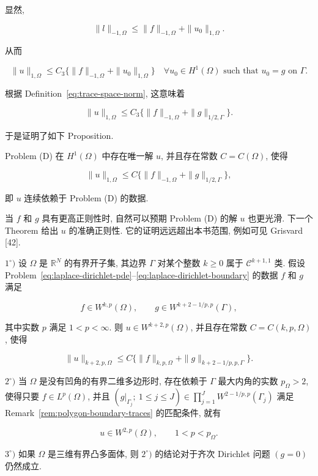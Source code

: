 显然,

\[
\|l\|_{-1,\Omega}\leq\|f\|_{-1,\Omega}+\|u_0\|_{1,\Omega}.
\]

从而

\[
\|u\|_{1,\Omega}\leq C_3\{\|f\|_{-1,\Omega}+\|u_0\|_{1,\Omega}\}\quad\forall u_0\in H^1(\Omega)\text{ such that }u_0=g\text{ on }\Gamma.
\]

根据 Definition~\eqref{eq:trace-space-norm}, 这意味着

\[
\|u\|_{1,\Omega}\leq C_3\{\|f\|_{-1,\Omega}+\|g\|_{1/2,\Gamma}\}.
\]

于是证明了如下 Proposition.

\setcounter{statement}{0}
\renewcommand{\theHstatement}{proposition.\thesection.\arabic{statement}}
\begin{Proposition}\label{prop:laplace-dirichlet-wellposedness}
Problem (D) 在 $H^1(\Omega)$ 中存在唯一解 $u$, 并且存在常数 $C=C(\Omega)$, 使得

\begin{equation}\label{eq:dirichlet-stability-h1}
\|u\|_{1,\Omega}\leq C\{\|f\|_{-1,\Omega}+\|g\|_{1/2,\Gamma}\},
\end{equation}

即 $u$ 连续依赖于 Problem (D) 的数据.
\end{Proposition}

当 $f$ 和 $g$ 具有更高正则性时, 自然可以预期 Problem (D) 的解 $u$ 也更光滑. 下一个 Theorem 给出 $u$ 的准确正则性. 它的证明远远超出本书范围, 例如可见 Grisvard [42].

\setcounter{statement}{7}
\renewcommand{\theHstatement}{theorem.\thesection.\arabic{statement}}
\begin{Theorem}\label{thm:laplace-dirichlet-regularity}
$1^\circ)$ 设 $\Omega$ 是 $\mathbb R^N$ 的有界开子集, 其边界 $\Gamma$ 对某个整数 $k\geq0$ 属于 $\mathcal C^{k+1,1}$ 类. 假设 Problem~\eqref{eq:laplace-dirichlet-pde}--\eqref{eq:laplace-dirichlet-boundary} 的数据 $f$ 和 $g$ 满足

\[
f\in W^{k,p}(\Omega),\qquad g\in W^{k+2-1/p,p}(\Gamma),
\]

其中实数 $p$ 满足 $1<p<\infty$. 则 $u\in W^{k+2,p}(\Omega)$, 并且存在常数 $C=C(k,p,\Omega)$, 使得

\begin{equation}\label{eq:dirichlet-regularity-wkp}
\|u\|_{k+2,p,\Omega}\leq C\{\|f\|_{k,p,\Omega}+\|g\|_{k+2-1/p,p,\Gamma}\}.
\end{equation}

$2^\circ)$ 当 $\Omega$ 是没有凹角的有界二维多边形时, 存在依赖于 $\Gamma$ 最大内角的实数 $p_\Omega>2$, 使得只要 $f\in L^p(\Omega)$, 并且 $(g|_{\Gamma_j};\ 1\leq j\leq J)\in\prod_{j=1}^J W^{2-1/p,p}(\Gamma_j)$ 满足 Remark~\ref{rem:polygon-boundary-traces} 的匹配条件, 就有

\[
u\in W^{2,p}(\Omega),\qquad1<p<p_\Omega.
\]

$3^\circ)$ 如果 $\Omega$ 是三维有界凸多面体, 则 $2^\circ)$ 的结论对于齐次 Dirichlet 问题 $(g=0)$ 仍然成立.
\end{Theorem}

